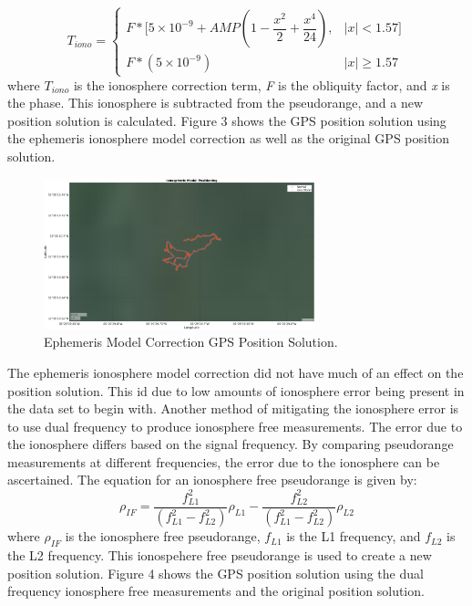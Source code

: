 \documentclass[11pt]{article}
\begin{document}
\begin{enumerate}[label=\textbf{\arabic*.}]
    \begin{equation}
    T_{iono}=\begin{cases}
    F*[5\times10^{-9}+AMP(1-\dfrac{x^2}{2}+\dfrac{x^4}{24}), & |x|<1.57]\\
    F*(5\times10^{-9}) & |x|\geq 1.57
    \end{cases}
    \end{equation}
where \textit{$T_{iono}$} is the ionosphere correction term, \textit{F} is the obliquity factor, and \textit{x} is the phase. This ionosphere is subtracted from the pseudorange, and a new position solution is calculated. Figure 3 shows the GPS position solution using the ephemeris ionosphere model correction as well as the original GPS position solution.
   \begin{figure}[H]
        \centering
        \includegraphics[width=0.7\textwidth]{p1_c.png}
        \caption{Ephemeris Model Correction GPS Position Solution.}
    \end{figure}
The ephemeris ionosphere model correction did not have much of an effect on the position solution. This id due to low amounts of ionosphere error being present in the data set to begin with. Another method of mitigating the ionosphere error is to use dual frequency to produce ionosphere free measurements. The error due to the ionosphere differs based on the signal frequency. By comparing pseudorange measurements at different frequencies, the error due to the ionosphere can be ascertained. The equation for an ionosphere free pseudorange is given by:
    \begin{equation}
        \rho_{IF}=\dfrac{f_{L1}^2}{(f_{L1}^2-f_{L2}^2)}\rho_{L1}-\dfrac{f_{L2}^2}{(f_{L1}^2-f_{L2}^2)}\rho_{L2}
    \end{equation}
where \textit{$\rho_{IF}$} is the ionosphere free pseudorange, \textit{$f_{L1}$} is the L1 frequency, and \textit{$f_{L2}$} is the L2 frequency. This ionospehere free pseudorange is used to create a new position solution. Figure 4 shows the GPS position solution using the dual frequency ionosphere free measurements and the original position solution. 

\end{enumerate}
\end{document}
